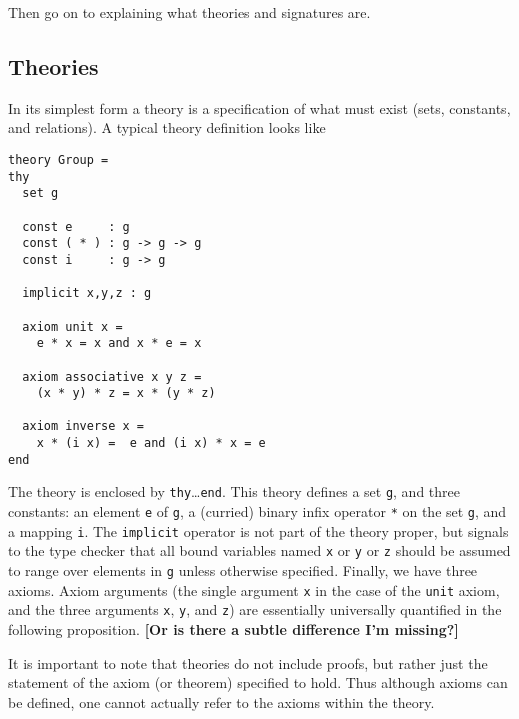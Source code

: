 \documentclass{article}
\newcommand{\comment}[1]{\textbf{[#1]}}
\begin{document}
Then go on to explaining what theories and signatures are.

\subsection{Theories}
\label{sec:theories}

In its simplest form a theory is a specification of what must exist
(sets, constants, and relations).  A typical theory definition looks like
\begin{Verbatim}
theory Group =
thy
  set g  

  const e     : g
  const ( * ) : g -> g -> g
  const i     : g -> g

  implicit x,y,z : g

  axiom unit x =
    e * x = x and x * e = x

  axiom associative x y z =
    (x * y) * z = x * (y * z)

  axiom inverse x =
    x * (i x) =  e and (i x) * x = e
end  
\end{Verbatim}
The theory is enclosed by \Verb|thy|\ldots\Verb|end|.  This theory
defines a set \Verb|g|, and three constants: an element \Verb|e| of
\Verb|g|, a (curried) binary infix operator \Verb|*| on the set
\Verb|g|, and a mapping \Verb|i|.  The \Verb|implicit| operator is not
part of the theory proper, but signals to the type checker that all
bound variables named \Verb|x| or \Verb|y| or \Verb|z| should be
assumed to range over elements in \Verb|g| unless otherwise specified.
Finally, we have three axioms.  Axiom arguments (the single argument
\Verb|x| in the case of the \Verb|unit| axiom, and the three arguments
\Verb|x|, \Verb|y|, and \Verb|z|) are essentially universally
quantified in the following proposition.  \comment{Or is there a subtle difference I'm missing?}

It is important to note that theories do not include proofs, but
rather just the statement of the axiom (or theorem) specified to hold.
Thus although axioms can be defined, one cannot actually refer to
the axioms within the theory.
\end{document}
